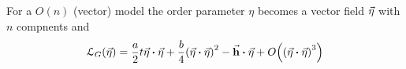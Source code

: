 \documentclass[../main/main.tex]{subfiles}
\begin{document}
\begin{remark}
For a \( O(n) \) (vector) model the order parameter \( \eta  \) becomes a vector field \( \va{\eta } \) with \( n \) compnents and
\begin{equation}
  \mathcal{L}_G ( \va{\eta }) = \frac{a}{2} t \va{\eta } \vdot \va{\eta } + \frac{b}{4} \qty(\va{\eta } \vdot \va{\eta } )^2 - \va{h} \vdot \va{\eta } + O \qty(\qty(\va{\eta } \vdot \va{\eta })^3 )
\end{equation}
\end{remark}
\end{document}
